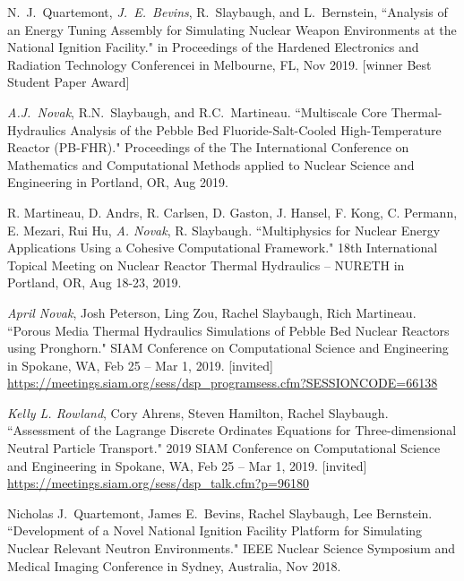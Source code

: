 \begin{bibsection}
\item N.\ J.\ Quartemont, \textit{J.\ E.\ Bevins}, R.\ Slaybaugh, and L.\ Bernstein, ``Analysis
of an Energy Tuning Assembly for Simulating Nuclear Weapon Environments at the
National Ignition Facility." in Proceedings of the Hardened Electronics and
Radiation Technology Conferencei in Melbourne, FL, Nov 2019. [winner Best Student Paper Award]

\item \textit{A.J.\ Novak}, R.N.\ Slaybaugh, and R.C.\ Martineau. ``Multiscale
Core Thermal-Hydraulics Analysis of the Pebble Bed Fluoride-Salt-Cooled
High-Temperature Reactor (PB-FHR)." Proceedings of the The International
Conference on Mathematics and Computational Methods applied to Nuclear Science
and Engineering in Portland, OR, Aug 2019. 

\item R. Martineau, D. Andrs, R. Carlsen, D. Gaston, J. Hansel, F. Kong, C. Permann, E. Mezari, Rui Hu, \textit{A. Novak}, R. Slaybaugh. ``Multiphysics for Nuclear Energy Applications Using a Cohesive Computational Framework." 18th International Topical Meeting on Nuclear Reactor Thermal Hydraulics – NURETH in Portland, OR, Aug 18-23, 2019. 

\item \textit{April Novak}, Josh Peterson, Ling Zou, Rachel Slaybaugh, Rich Martineau. ``Porous Media Thermal Hydraulics Simulations of Pebble Bed Nuclear Reactors using Pronghorn." SIAM Conference on Computational Science and Engineering in Spokane, WA, Feb 25 – Mar 1, 2019. [invited]\\
\url{https://meetings.siam.org/sess/dsp_programsess.cfm?SESSIONCODE=66138}

\item \textit{Kelly L. Rowland}, Cory Ahrens, Steven Hamilton, Rachel Slaybaugh. ``Assessment of the Lagrange Discrete Ordinates Equations for Three-dimensional Neutral Particle Transport." 2019 SIAM Conference on Computational Science and Engineering in Spokane, WA, Feb 25 – Mar 1, 2019. [invited]\\
\url{https://meetings.siam.org/sess/dsp_talk.cfm?p=96180}

\item Nicholas J.\ Quartemont, James E.\ Bevins, Rachel Slaybaugh, Lee Bernstein. ``Development of a Novel National Ignition Facility Platform for Simulating Nuclear Relevant Neutron Environments." IEEE Nuclear Science Symposium and Medical Imaging Conference in Sydney, Australia, Nov 2018. 


\end{bibsection}
